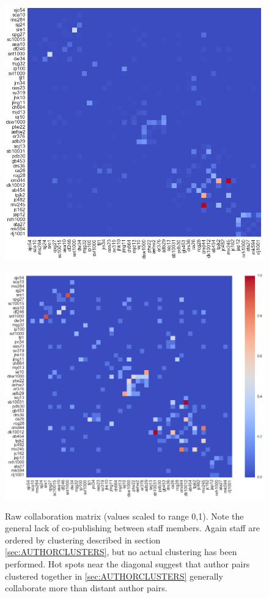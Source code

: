 \begin{figure}[H]
  \centering
  \begin{minipage}[b]{0.49\textwidth}
  \label{fig:rawcollabs}
    \includegraphics[width=\textwidth]{Analysis/raw_collabs.png}
    \caption{Raw collaboration matrix (values scaled to range 0,1). Note the general lack of co-publishing between staff members. Again staff are ordered by clustering described in section \ref{sec:AUTHORCLUSTERS}, but no actual clustering has been performed. Hot spots near the diagonal suggest that author pairs clustered together in \ref{sec:AUTHORCLUSTERS} generally collaborate more than distant author pairs.  }
  \end{minipage}
  \hfill
  \begin{minipage}[b]{0.49\textwidth}
  \label{fig:collcollabs}
    \includegraphics[width=\textwidth]{Analysis/comm_collabs.png}

\end{minipage}
\end{figure}
